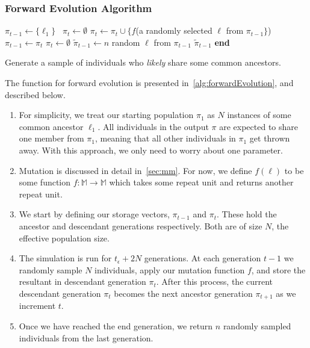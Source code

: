 \subsubsection{Forward Evolution Algorithm}
\begin{algorithm}[t]
    \SetAlgoLined
    \DontPrintSemicolon
     {
        $\pi_{t-1} \gets \{ \ell_1 \}$  \
        $\pi_t \gets \emptyset$ \;
         {
             {
                $\pi_t \gets \pi_t \cup \{f$(a randomly selected $\ell$ from $\pi_{t-1} \}$) \;
            }
            $\pi_{t-1} \gets \pi_t$ \;
            $\pi_t \gets \emptyset$ \;
        }
        $\tilde{\pi}_{t-1} \gets n$ random $\ell$ from $\pi_{t-1}$ \;
        \Return $\tilde{\pi}_{t-1}$ \;
    }
    \textbf{end} \;
    \caption{Generate a sample of individuals who \emph{likely} share some common ancestors.}
    \label{alg:forwardEvolution}
\end{algorithm}

The function for forward evolution is presented in~\autoref{alg:forwardEvolution}, and described below.
\begin{enumerate}
    \item For simplicity, we treat our starting population $\pi_1$ as $N$ instances of some common ancestor $\ell_1$.
        All individuals in the output $\pi$ are expected to share one member from $\pi_1$, meaning that all other
        individuals in $\pi_1$ get thrown away.
        With this approach, we only need to worry about one parameter.
    \item Mutation is discussed in detail in~\autoref{sec:mm}.
        For now, we define $f(\ell)$ to be some function $f : \mathbb{M} \rightarrow \mathbb{M}$ which
        takes some repeat unit and returns another repeat unit.
    \item We start by defining our storage vectors, $\pi_{t-1}$ and $\pi_t$.
        These hold the ancestor and descendant generations respectively.
        Both are of size $N$, the effective population size.
    \item The simulation is run for $t_\epsilon + 2N$ generations.
        At each generation $t - 1$ we randomly sample $N$ individuals, apply our mutation function $f$, and store the
        resultant in descendant generation $\pi_t$.
        After this process, the current descendant generation $\pi_t$ becomes the next ancestor generation $\pi_{t+1}$
        as we increment $t$.
    \item Once we have reached the end generation, we return $n$ randomly sampled individuals from the last generation.
\end{enumerate}

